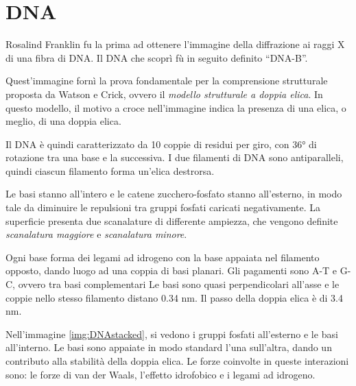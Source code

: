 \chapter{DNA}


Rosalind Franklin fu la prima ad ottenere l'immagine della diffrazione ai raggi X di una fibra di DNA. Il DNA che scoprì fù in seguito definito ``DNA-B''.

Quest'immagine fornì la prova fondamentale per la comprensione strutturale proposta da Watson e Crick, ovvero il \emph{modello strutturale a doppia elica}.
In questo modello, il motivo a croce nell'immagine indica la presenza di una elica, o meglio, di una doppia elica.

Il DNA è quindi caratterizzato da 10 coppie di residui per giro, con 36° di rotazione tra una base e la successiva.
I due filamenti di DNA sono antiparalleli, quindi ciascun filamento forma un'elica destrorsa.

Le basi stanno all'intero e le catene zucchero-fosfato stanno all'esterno, in modo tale da diminuire le repulsioni tra gruppi fosfati caricati negativamente.
La superficie presenta due scanalature di differente ampiezza, che vengono definite \emph{scanalatura maggiore} e \emph{scanalatura minore}.

Ogni base forma dei legami ad idrogeno con la base appaiata nel filamento opposto, dando luogo ad una coppia di basi planari. Gli pagamenti sono A-T e G-C, ovvero tra basi complementari
Le basi sono quasi perpendicolari all'asse e le coppie nello stesso filamento distano 0.34 nm. Il passo della doppia elica è di 3.4 nm.



Nell'immagine \ref{img:DNAstacked}, si vedono i gruppi fosfati all'esterno e le basi all'interno. Le basi sono appaiate in modo standard l'una sull'altra, dando un contributo alla stabilità della doppia elica. Le forze coinvolte in queste interazioni sono: le forze di van der Waals, l'effetto idrofobico e i legami ad idrogeno.



